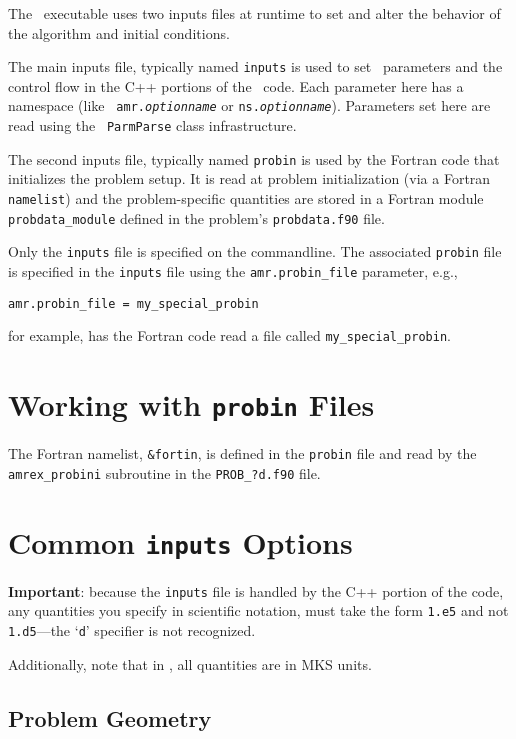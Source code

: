 The \iamr\ executable uses two inputs files at runtime to set and alter the
behavior of the algorithm and initial conditions.

The main inputs file, typically named {\tt inputs} is used to
set \amrex\ parameters and the control flow in the C++ portions of
the \iamr\ code.  Each parameter here has a namespace (like {\tt
amr.{\em optionname}} or {\tt ns.{\em optionname}}).  Parameters
set here are read using the \amrex\ {\tt ParmParse} class
infrastructure.

The second inputs file, typically named {\tt probin} is used by the
Fortran code that initializes the problem setup.  It is read at
problem initialization (via a Fortran {\tt namelist}) and the
problem-specific quantities are stored in a Fortran module {\tt
probdata\_module} defined in the problem's {\tt probdata.f90} file.

Only the {\tt inputs} file is specified on the commandline.  The
associated {\tt probin} file is specified in the {\tt inputs} file
using the {\tt amr.probin\_file} parameter, e.g.,
\begin{lstlisting}
amr.probin_file = my_special_probin
\end{lstlisting}
for example, has the Fortran code read a file called {\tt my\_special\_probin}.

\section{Working with {\tt probin} Files}

The Fortran namelist, {\tt \&fortin}, is defined in the {\tt probin} file
and read by the {\tt amrex\_probini} subroutine in the {\tt PROB\_?d.f90} file.

\section{Common {\tt inputs} Options}

{\bf Important}: because the {\tt inputs} file is handled by the C++ portion of
the code, any quantities you specify in scientific notation, must take the
form {\tt 1.e5} and not {\tt 1.d5}---the `{\tt d}' specifier is not recognized.

Additionally, note that in \iamr, all quantities are in MKS units.

\subsection{Problem Geometry}

